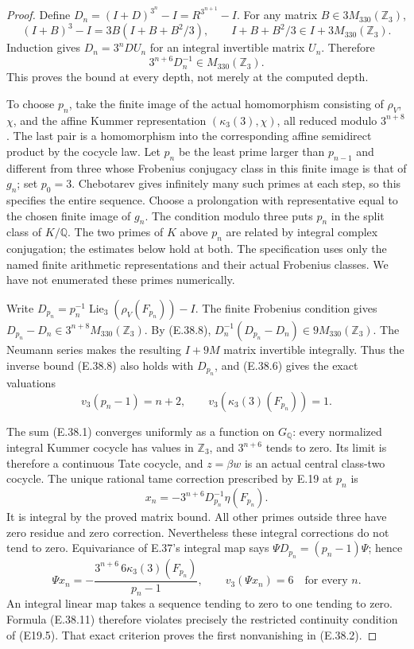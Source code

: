 \documentclass[11pt,oneside]{article}
\begin{document}
\begin{proof}
Define
$D_n=(I+D)^{3^n}-I=R^{3^{n+1}}-I$.
For any matrix $B\in3M_{330}(\mathbb Z_3)$,
\[
 (I+B)^3-I=3B(I+B+B^2/3),
          \qquad I+B+B^2/3\in I+3M_{330}(\mathbb Z_3).
\]
Induction gives $D_n=3^nD U_n$ for an
integral invertible matrix $U_n$.
Therefore
\[
                        3^{n+6}D_n^{-1}
                             \in M_{330}(\mathbb Z_3).
 \tag{E.38.8}
\]
This proves the bound at every depth,
not merely at the computed depth.

To choose $p_n$, take the finite image
of the actual homomorphism consisting
of $\rho_V$, $\chi$, and the affine
Kummer representation $(\kappa_3(3),\chi)$,
all reduced modulo $3^{n+8}$.
The last pair is a homomorphism into
the corresponding affine semidirect
product by the cocycle law. Let $p_n$
be the least prime larger than $p_{n-1}$
and different from three whose Frobenius
conjugacy class in this finite image
is that of $g_n$; set $p_0=3$.
Chebotarev gives infinitely many such
primes at each step, so this specifies
the entire sequence. Choose a
prolongation with representative equal
to the chosen finite image of $g_n$.
The condition modulo three puts $p_n$
in the split class of $K/\mathbb Q$.
The two primes of $K$ above $p_n$ are
related by integral complex conjugation;
the estimates below hold at both.
The specification uses only the named
finite arithmetic representations and
their actual Frobenius classes. We have
not enumerated these primes numerically.

Write
$D_{p_n}=p_n^{-1}\operatorname{Lie}_3
(\rho_V(F_{p_n}))-I$.
The finite Frobenius condition gives
$D_{p_n}-D_n\in3^{n+8}M_{330}(\mathbb Z_3)$.
By (E.38.8),
$D_n^{-1}(D_{p_n}-D_n)\in9M_{330}(\mathbb Z_3)$.
The Neumann series makes the resulting
$I+9M$ matrix invertible integrally.
Thus the inverse bound (E.38.8) also
holds with $D_{p_n}$, and (E.38.6)
gives the exact valuations
\[
 v_3(p_n-1)=n+2,
 \qquad v_3(\kappa_3(3)(F_{p_n}))=1.
 \tag{E.38.9}
\]

The sum (E.38.1) converges uniformly
as a function on $G_{\mathbb Q}$:
every normalized integral Kummer
cocycle has values in $\mathbb Z_3$,
and $3^{n+6}$ tends to zero. Its limit
is therefore a continuous Tate cocycle,
and $z=\beta w$ is an actual central
class-two cocycle. The unique rational
tame correction prescribed by E.19
at $p_n$ is
\[
 x_n=-3^{n+6}D_{p_n}^{-1}\eta(F_{p_n}).
 \tag{E.38.10}
\]
It is integral by the proved matrix
bound. All other primes outside three
have zero residue and zero correction.
Nevertheless these integral corrections
do not tend to zero. Equivariance of
E.37's integral map says
$\Psi D_{p_n}=(p_n-1)\Psi$; hence
\[
 \Psi x_n=-\frac{3^{n+6}\,6\kappa_3(3)(F_{p_n})}
                            {p_n-1},
       \qquad v_3(\Psi x_n)=6
                  \quad\text{for every }n.
 \tag{E.38.11}
\]
An integral linear map takes a sequence
tending to zero to one tending to
zero. Formula (E.38.11) therefore
violates precisely the restricted
continuity condition of (E19.5).
That exact criterion proves the first
nonvanishing in (E.38.2).


\end{proof}
\end{document}
